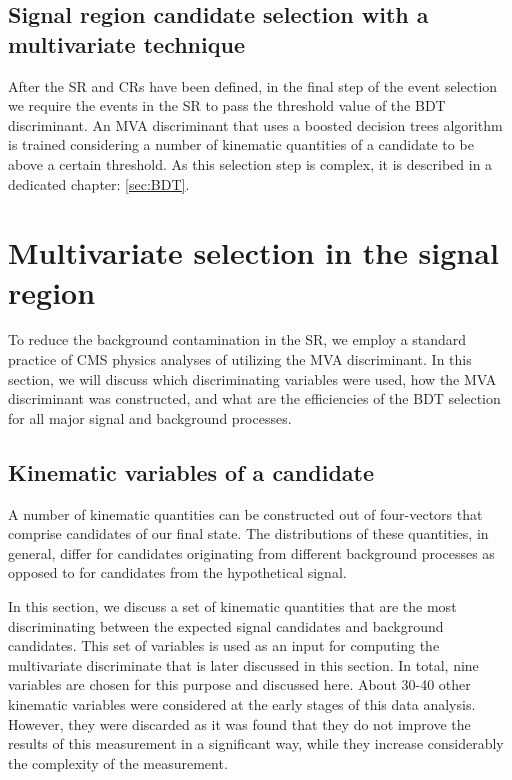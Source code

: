 \begin{small}
\subsection{Signal region candidate selection with a multivariate technique}

After the SR and CRs have been defined, in the final step of the event selection we require the events in the SR to pass the threshold value of the BDT discriminant. An MVA discriminant that uses a boosted decision trees algorithm is trained considering a number of kinematic quantities of a candidate to be above a certain threshold. As this selection step is complex, it is described in a dedicated chapter: \ref{sec:BDT}.


\section{Multivariate selection in the signal region}

To reduce the background contamination in the SR, we employ a standard practice of CMS physics analyses of utilizing the MVA discriminant. In this section, we will discuss which discriminating variables were used, how the MVA discriminant was constructed, and what are the efficiencies of the BDT selection for all major signal and background processes. 
\label{sec:BDT}

\subsection{Kinematic variables of a candidate}
\label{variables}

A  number of kinematic quantities can be constructed out of four-vectors that comprise candidates of our final state.  The distributions of these quantities, in general, differ for candidates originating from different background processes as opposed to for candidates from the hypothetical signal. 
           
In this section, we discuss a set of kinematic quantities that are the most discriminating between the expected signal candidates and background candidates. This set of variables is used as an input for computing the multivariate discriminate that is later discussed in this section. In total, nine variables are chosen for this purpose and discussed here. About 30-40 other kinematic variables were considered at the early stages of this data analysis. However, they were discarded as it was found that they do not improve the results of this measurement in a  significant way, while they increase considerably the complexity of the measurement.
           

\end{small}
